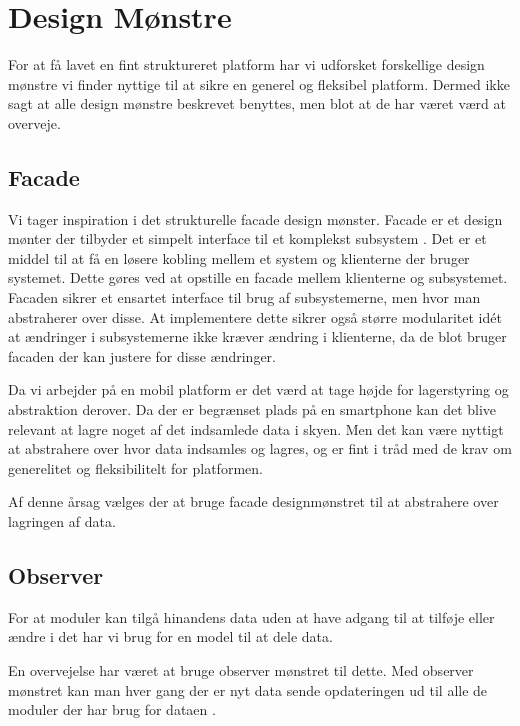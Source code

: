 \section{Design Mønstre}
For at få lavet en fint struktureret platform har vi udforsket forskellige design mønstre vi finder nyttige til at sikre en generel og fleksibel platform.
Dermed ikke sagt at alle design mønstre beskrevet benyttes, men blot at de har været værd at overveje.

\subsection{Facade}
Vi tager inspiration i det strukturelle facade design mønster.
Facade er et design mønter der tilbyder et simpelt interface til et komplekst subsystem \citep{DATGANGOFFOUR}. 
Det er et middel til at få en løsere kobling mellem et system og klienterne der bruger systemet.
Dette gøres ved at opstille en facade mellem klienterne og subsystemet.
Facaden sikrer et ensartet interface til brug af subsystemerne, men hvor man abstraherer over disse.
At implementere dette sikrer også større modularitet idét at ændringer i subsystemerne ikke kræver ændring i klienterne, da de blot bruger facaden der kan justere for disse ændringer.

Da vi arbejder på en mobil platform er det værd at tage højde for lagerstyring og abstraktion derover.
Da der er begrænset plads på en smartphone kan det blive relevant at lagre noget af det indsamlede data i skyen.
Men det kan være nyttigt at abstrahere over hvor data indsamles og lagres, og er fint i tråd med de krav om generelitet og fleksibilitelt for platformen.

Af denne årsag vælges der at bruge facade designmønstret til at abstrahere over lagringen af data.




\subsection{Observer}
For at moduler kan tilgå hinandens data uden at have adgang til at tilføje eller ændre i det har vi brug for en model til at dele data.

En overvejelse har været at bruge observer mønstret til dette.
Med observer mønstret kan man hver gang der er nyt data sende opdateringen ud til alle de moduler der har brug for dataen \cite[p.~244]{gamma1994design}.

